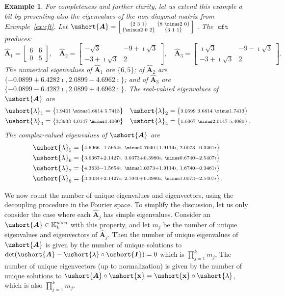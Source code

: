 \documentclass[1p,authoryear,letterpaper]{elsarticle}
\newtheorem{example}[theorem]{Example}
\providecommand{\ii}{\imath}
\providecommand{\KK}{\mathbb{K}}
\providecommand{\bmat}[1]{\begin{bmatrix} #1 \end{bmatrix}}
\providecommand{\sbmat}[1]{\left[\begin{smallmatrix} #1 \end{smallmatrix}\right]}
\providecommand{\mat}{\boldsymbol}
\renewcommand{\vec}{\mathbf}
\providecommand{\mhat}[1]{\ensuremath{\mat{\hat{#1}}}}
\providecommand{\mAhat}{\mhat{A}}
\DeclareMathOperator{\cft}{\texttt{cft}}
\newcommand{\cel}[1]{\ushort{#1}}
\newcommand{\csbmat}[1]{\left\{\! \begin{smallmatrix} #1
\end{smallmatrix} \! \right\}}
\newcommand{\celm}[1]{\cel{\mat{#1}}}
\newcommand{\celv}[1]{\cel{\vec{#1}}}
\newcommand{\clambda}{\ensuremath{\cel{\lambda}}}
\newcommand{\cvx}{\ensuremath{\celv{x}}}
\providecommand{\cmA}{\ensuremath{\celm{A}}}
\providecommand{\cmI}{\ensuremath{\celm{I}}}
\begin{document}
\begin{example}
For completeness and further clarity, let us extend this example a bit by presenting also the eigenvalues of the non-diagonal matrix from Example~\ref{ex:cft}.
Let $\cmA = \sbmat{ \csbmat{2 & 3 & 1} & \csbmat{8 & \minus2 & 0} \\
                 \csbmat{\minus2 & 0 & 2} & \csbmat{3 & 1 & 1} }$ .
The $\cft$ produces:
\[ \mAhat_1 = \bmat{6 & 6\\0 & 5}, \quad
   \mAhat_2 = \bmat{\minus \sqrt{3} & \minus9 + \ii\sqrt{3} \\ \minus3 + \ii\sqrt{3} & 2}, \quad
   \mAhat_3 = \bmat{\ii \sqrt{3} & \minus9 - \ii\sqrt{3} \\ \minus3 + \ii\sqrt{3} & 2}. \]
The numerical eigenvalues of $\mAhat_1$ are $\{6, 5\}$; of $\mAhat_2$ are
$\{ \minus0.0899 + 6.4282\ii, 2.0899 - 4.6962\ii \}$; and of
$\mAhat_3$ are $\{ \minus0.0899 - 6.4282\ii, 2.0899 + 4.6962\ii \}$.
The real-valued eigenvalues of $\cmA$ are
\[
\begin{aligned}
\clambda_1 & = \csbmat{1.9401 & \minus1.6814 & 5.7413} &
\clambda_2 & = \csbmat{3.0599 & 3.6814 & \minus1.7413}  \\
\clambda_3 & = \csbmat{3.3933 & 4.0147 & \minus1.4080} &
\clambda_4 & = \csbmat{1.6067 & \minus2.0147 & 5.4080} .
\end{aligned}
\]
The complex-valued eigenvalues of $\cmA$ are \[
\begin{aligned}
\clambda_5 & = \csbmat{4.6966 - 1.5654\ii, & \minus0.7040 + 1.9114\ii, & 2.0073 - 0.3461\ii} \\
\clambda_6 & = \csbmat{3.6367 + 2.1427\ii, & 3.0373 + 0.3980\ii, & \minus0.6740 - 2.5407\ii}  \\
\clambda_7 & = \csbmat{4.3633 - 1.5654\ii, & \minus1.0373 + 1.9114\ii, & 1.6740 - 0.3461\ii } \\
\clambda_8 & = \csbmat{3.3034 + 2.1427\ii, & 2.7040 + 0.3980\ii, & \minus1.0073 - 2.5407\ii} .
\end{aligned}
\]
\end{example}


We now count the number of unique eigenvalues and eigenvectors,
using the decoupling procedure in the Fourier space.
To simplify the discussion, let us only consider the case
where each $\mAhat_j$ has simple eigenvalues.
Consider an $\cmA \in \KK_k^{n \times n}$ with this property,
and let $m_j$ be the number of unique eigenvalues
and eigenvectors of $\mAhat_j$.
Then the number
of unique eigenvalues of $\cmA$ is given by the number of
unique solutions to $\det(\cmA - \clambda \circ \cmI)=0$
 which is $\prod_{j=1}^k m_j$.  The number of unique
 eigenvectors (up to normalization) is given by the number
 of unique solutions to $\cmA \circ \cvx = \cvx \circ \clambda$,
 which is also $\prod_{j=1}^k m_j$.
\end{document}
